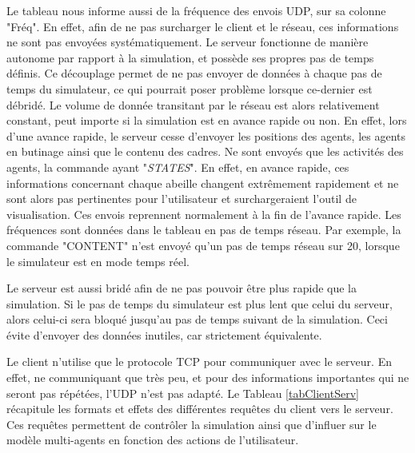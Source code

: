 	Le tableau nous informe aussi de la fréquence des envois UDP, sur sa colonne "Fréq". En effet, afin de ne pas surcharger le client et le réseau, ces informations ne sont pas envoyées systématiquement. Le serveur fonctionne de manière autonome par rapport à la simulation, et possède ses propres pas de temps définis. Ce découplage permet de ne pas envoyer de données à chaque pas de temps du simulateur, ce qui pourrait poser problème lorsque ce-dernier est débridé. Le volume de donnée transitant par le réseau est alors relativement constant, peut importe si la simulation est en avance rapide ou non. En effet, lors d'une avance rapide, le serveur cesse d'envoyer les positions des agents, les agents en butinage ainsi que le contenu des cadres. Ne sont envoyés que les activités des agents, la commande ayant "\textit{STATES}". En effet, en avance rapide, ces informations concernant chaque abeille changent extrêmement rapidement et ne sont alors pas pertinentes pour l'utilisateur et surchargeraient l'outil de visualisation. Ces envois reprennent normalement à la fin de l'avance rapide.
	Les fréquences sont données dans le tableau en pas de temps réseau. Par exemple, la commande "CONTENT" n'est envoyé qu'un pas de temps réseau sur 20, lorsque le simulateur est en mode temps réel. 
	
 	Le serveur est aussi bridé afin de ne pas pouvoir être plus rapide que la simulation. Si le pas de temps du simulateur est plus lent que celui du serveur, alors celui-ci sera bloqué jusqu'au pas de temps suivant de la simulation. Ceci évite d'envoyer des données inutiles, car strictement équivalente.
	
	Le client n'utilise que le protocole TCP pour communiquer avec le serveur. En effet, ne communiquant que très peu, et pour des informations importantes qui ne seront pas répétées, l'UDP n'est pas adapté. Le Tableau \ref{tabClientServ} récapitule les formats et effets des différentes requêtes du client vers le serveur. Ces requêtes permettent de contrôler la simulation ainsi que d'influer sur le modèle multi-agents en fonction des actions de l'utilisateur.
	
